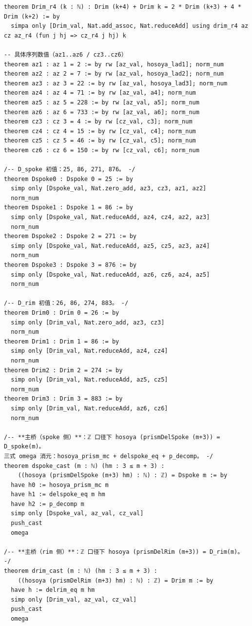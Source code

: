 \documentclass[11pt]{article}
\begin{document}
\begin{lstlisting}
theorem Drim_r4 (k : ℕ) : Drim (k+4) + Drim k = 2 * Drim (k+3) + 4 * Drim (k+2) := by
  simpa only [Drim_val, Nat.add_assoc, Nat.reduceAdd] using drim_r4 az cz az_r4 (fun j hj => cz_r4 j hj) k

-- 具体序列数值（az1..az6 / cz3..cz6）
theorem az1 : az 1 = 2 := by rw [az_val, hosoya_lad1]; norm_num
theorem az2 : az 2 = 7 := by rw [az_val, hosoya_lad2]; norm_num
theorem az3 : az 3 = 22 := by rw [az_val, hosoya_lad3]; norm_num
theorem az4 : az 4 = 71 := by rw [az_val, a4]; norm_num
theorem az5 : az 5 = 228 := by rw [az_val, a5]; norm_num
theorem az6 : az 6 = 733 := by rw [az_val, a6]; norm_num
theorem cz3 : cz 3 = 4 := by rw [cz_val, c3]; norm_num
theorem cz4 : cz 4 = 15 := by rw [cz_val, c4]; norm_num
theorem cz5 : cz 5 = 46 := by rw [cz_val, c5]; norm_num
theorem cz6 : cz 6 = 150 := by rw [cz_val, c6]; norm_num

/-- D_spoke 初值：25, 86, 271, 876。 -/
theorem Dspoke0 : Dspoke 0 = 25 := by
  simp only [Dspoke_val, Nat.zero_add, az3, cz3, az1, az2]
  norm_num
theorem Dspoke1 : Dspoke 1 = 86 := by
  simp only [Dspoke_val, Nat.reduceAdd, az4, cz4, az2, az3]
  norm_num
theorem Dspoke2 : Dspoke 2 = 271 := by
  simp only [Dspoke_val, Nat.reduceAdd, az5, cz5, az3, az4]
  norm_num
theorem Dspoke3 : Dspoke 3 = 876 := by
  simp only [Dspoke_val, Nat.reduceAdd, az6, cz6, az4, az5]
  norm_num

/-- D_rim 初值：26, 86, 274, 883。 -/
theorem Drim0 : Drim 0 = 26 := by
  simp only [Drim_val, Nat.zero_add, az3, cz3]
  norm_num
theorem Drim1 : Drim 1 = 86 := by
  simp only [Drim_val, Nat.reduceAdd, az4, cz4]
  norm_num
theorem Drim2 : Drim 2 = 274 := by
  simp only [Drim_val, Nat.reduceAdd, az5, cz5]
  norm_num
theorem Drim3 : Drim 3 = 883 := by
  simp only [Drim_val, Nat.reduceAdd, az6, cz6]
  norm_num

/-- **主桥（spoke 侧）**：ℤ 口径下 hosoya (prismDelSpoke (m+3)) = D_spoke(m)。
三式 omega 消元：hosoya_prism_mc + delspoke_eq + p_decomp。 -/
theorem dspoke_cast (m : ℕ) (hm : 3 ≤ m + 3) :
    ((hosoya (prismDelSpoke (m+3) hm) : ℕ) : ℤ) = Dspoke m := by
  have h0 := hosoya_prism_mc m
  have h1 := delspoke_eq m hm
  have h2 := p_decomp m
  simp only [Dspoke_val, az_val, cz_val]
  push_cast
  omega

/-- **主桥（rim 侧）**：ℤ 口径下 hosoya (prismDelRim (m+3)) = D_rim(m)。 -/
theorem drim_cast (m : ℕ) (hm : 3 ≤ m + 3) :
    ((hosoya (prismDelRim (m+3) hm) : ℕ) : ℤ) = Drim m := by
  have h := delrim_eq m hm
  simp only [Drim_val, az_val, cz_val]
  push_cast
  omega


\end{lstlisting}
\end{document}
